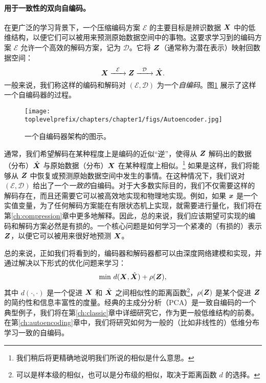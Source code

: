 \documentclass[../../book-main_zh.tex]{subfiles}
\begin{document}
\paragraph{用于一致性的双向自编码。}
在更广泛的学习背景下，一个压缩编码方案 $\mathcal{E}$ 的主要目标是辨识数据 $\bm{X}$ 中的低维结构，以便它们可以被用来预测原始数据空间中的事物。这要求学习到的编码方案 $\mathcal{E}$ 允许一个高效的解码方案，记为 $\mathcal D$。它将 $\bm{Z}$（通常称为潜在表示）映射回数据空间：
\begin{equation}
    \bm{X}   \xrightarrow{\hspace{2mm} \mathcal{E}\hspace{2mm}} \bm{Z}  \xrightarrow{\hspace{2mm} \mathcal{D} \hspace{2mm}} \hat {\bm{X}}.
       \label{eqn:auto-encoding}
\end{equation}
一般来说，我们称这样的编码和解码对 $(\mathcal{E}, \mathcal{D})$ 为一个{\em 自编码}。图\ref{fig:autoencoder}
展示了这样一个自编码器的过程。
\begin{figure}
    \centering
    \texttt{[image: \\toplevelprefix/chapters/chapter1/figs/Autoencoder.jpg]}
    \caption{一个自编码器架构的图示。}
    \label{fig:autoencoder}
\end{figure}


通常，我们希望解码在某种程度上是编码的近似“逆”，使得从 $\bm{Z}$ 解码出的数据（分布）$\hat {\bm{X}}$ 与原始数据（分布）$\bm{X}$ 在某种程度上相似。\footnote{我们稍后将更精确地说明我们所说的相似是什么意思。} 如果是这样，我们将能够从 $\bm{Z}$ 中恢复或预测原始数据空间中发生的事情。在这种情况下，我们说对 $(\mathcal{E}, \mathcal{D})$ 给出了一个{\em 一致的}自编码。对于大多数实际目的，我们不仅需要这样的解码存在，而且还需要它可以被高效地实现和物理地实现。例如，如果 $\bm{x}$ 是一个实值变量，为了任何解码方案能在有限状态机上实现，就需要进行量化，我们将在第\ref{ch:compression}章中更多地解释。因此，总的来说，我们应该期望可实现的编码和解码方案必然是有损的。一个核心问题是如何学习一个紧凑的（有损的）表示 $\bm{Z}$，以便它可以被用来很好地预测 $\bm{X}$。

总的来说，正如我们将看到的，编码器和解码器都可以由深度网络建模和实现，并通过解决以下形式的优化问题来学习：
\begin{equation}
   \min \, d( \bm{X}, \hat {\bm{X}}) + \rho(\bm{Z}), 
   \label{eqn:auto-encoding-objective}
\end{equation}
其中 $d(\cdot, \cdot)$ 是一个促进 $\bm{X}$ 和 $\hat {\bm{X}}$ 之间相似性的距离函数\footnote{可以是样本级的相似，也可以是分布级的相似，取决于距离函数 $d$ 的选择。}，$\rho(\bm{Z})$ 是某个促进 $\bm{Z}$ 的简约性和信息丰富性的度量。经典的主成分分析（PCA）\cite{JolliffeI2002}是一致自编码的一个典型例子，我们将在第\ref{ch:classic}章中详细研究它，作为更一般低维结构的前奏。在第\ref{ch:autoencoding}章中，我们将研究如何为一般的（比如非线性的）低维分布学习一致的自编码。
\end{document}
